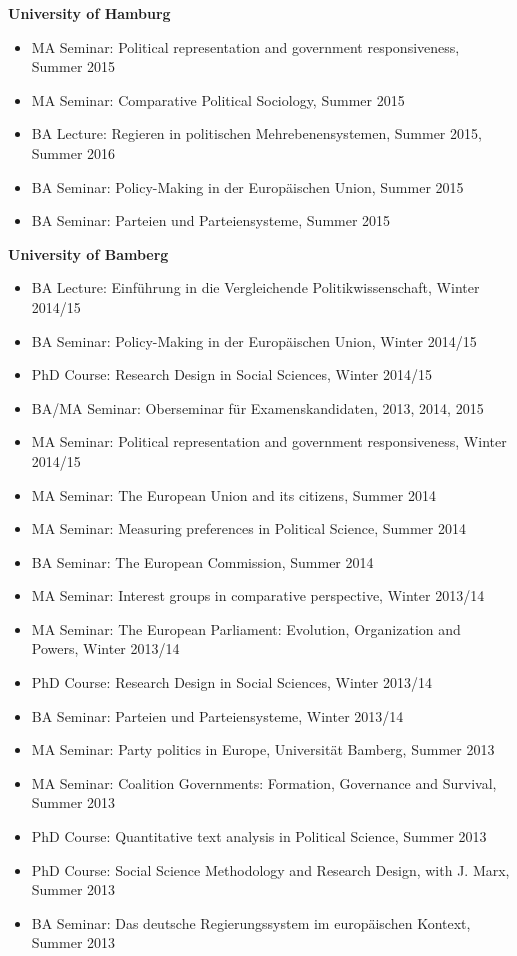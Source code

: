 \vspace{\baselineskip}

\textbf{University of Hamburg}
\begin{itemize}[topsep=0pt, noitemsep, leftmargin=3]
	\item MA Seminar: Political representation and government responsiveness, Summer 2015
	\item MA Seminar: Comparative Political Sociology, Summer 2015
	\item BA Lecture: Regieren in politischen Mehrebenensystemen, Summer 2015, Summer 2016
	\item BA Seminar: Policy-Making in der Europ\"aischen Union, Summer 2015
	\item BA Seminar: Parteien und Parteiensysteme, Summer 2015
\end{itemize}

\vspace{\baselineskip}

\textbf{University of Bamberg}
\begin{itemize}[topsep=0pt, noitemsep, leftmargin=3]
	\item BA Lecture: Einführung in die Vergleichende Politikwissenschaft,  Winter 2014/15
	\item BA Seminar: Policy-Making in der Europäischen Union, Winter 2014/15
	\item PhD Course: Research Design in Social Sciences, Winter 2014/15
	\item BA/MA Seminar: Oberseminar für Examenskandidaten, 2013, 2014, 2015
	\item MA Seminar: Political representation and government responsiveness, Winter 2014/15
	\item MA Seminar: The European Union and its citizens, Summer 2014
	\item MA Seminar: Measuring preferences in Political Science, Summer 2014
	\item BA Seminar: The European Commission, Summer 2014
	\item MA Seminar: Interest groups in comparative perspective, Winter 2013/14
	\item MA Seminar: The European Parliament: Evolution, Organization and Powers, Winter 2013/14
	\item PhD Course: Research Design in Social Sciences, Winter 2013/14
	\item BA Seminar: Parteien und Parteiensysteme, Winter 2013/14
	\item MA Seminar: Party politics in Europe, Universität Bamberg, Summer 2013
	\item MA Seminar: Coalition Governments: Formation, Governance and Survival, Summer 2013
	\item PhD Course: Quantitative text analysis in Political Science, Summer 2013
	\item PhD Course: Social Science Methodology and Research Design, with J. Marx, Summer 2013
	\item BA Seminar: Das deutsche Regierungssystem im europäischen Kontext,  Summer 2013
\end{itemize}

